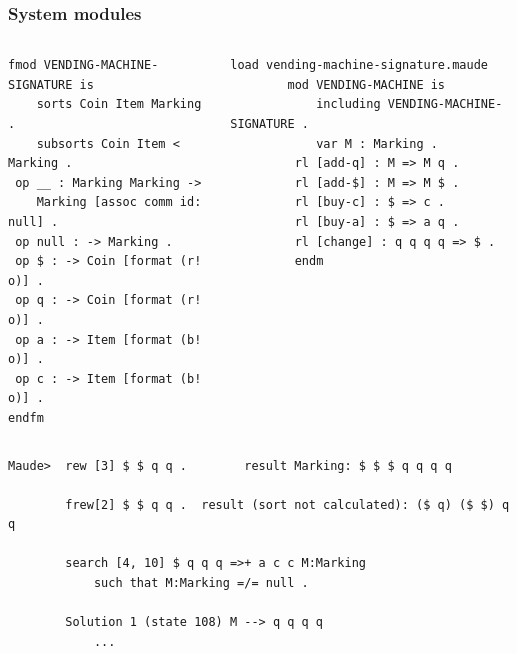 \documentclass{beamer}
\begin{document}
\begin{frame}[fragile]
    \frametitle{System modules}
    \scriptsize
    \begin{columns}
        \begin{column}{.5\textwidth}
            
            \begin{lstlisting}[language=maude]
 fmod VENDING-MACHINE-SIGNATURE is
    sorts Coin Item Marking .
    subsorts Coin Item < Marking .
 op __ : Marking Marking ->
    Marking [assoc comm id: null] .
 op null : -> Marking .
 op $ : -> Coin [format (r! o)] .
 op q : -> Coin [format (r! o)] .
 op a : -> Item [format (b! o)] .
 op c : -> Item [format (b! o)] .
endfm
            \end{lstlisting}
        \end{column}
        \begin{column}{.5\textwidth}
            \begin{lstlisting}[language=maude]
        load vending-machine-signature.maude
        mod VENDING-MACHINE is
            including VENDING-MACHINE-SIGNATURE .
            var M : Marking .
         rl [add-q] : M => M q .
         rl [add-$] : M => M $ .
         rl [buy-c] : $ => c .
         rl [buy-a] : $ => a q .
         rl [change] : q q q q => $ .
         endm
    \end{lstlisting}
        \end{column}
    \end{columns}
   \begin{lstlisting}[language=maude]
Maude>  rew [3] $ $ q q .        result Marking: $ $ $ q q q q
    
        frew[2] $ $ q q .  result (sort not calculated): ($ q) ($ $) q q                 
        
        search [4, 10] $ q q q =>+ a c c M:Marking 
            such that M:Marking =/= null .
        
        Solution 1 (state 108) M --> q q q q 
            ...
    \end{lstlisting} 
\end{frame}
\end{document}
